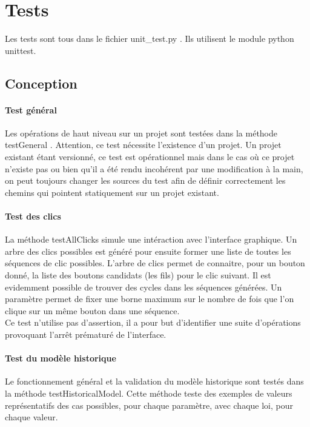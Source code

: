 \documentclass[12pt,a4paper]{article}
\begin{document}
\section{Tests}
    Les tests sont tous dans le fichier unit\_test.py . Ils utilisent le module
    python unittest.
    \subsection{Conception}
    \paragraph{Test général}
    Les opérations de haut niveau sur un projet sont testées dans la méthode
    testGeneral . Attention, ce test nécessite l'existence d'un projet. 
    Un projet existant étant versionné, ce test est opérationnel mais dans le
    cas où ce projet n'existe pas ou bien qu'il a été rendu incohérent par une
    modification à la main, on peut toujours changer les sources du test afin de
    définir correctement les chemins qui pointent statiquement sur un projet
    existant.
    \paragraph{Test des clics}
    La méthode testAllClicks simule une intéraction avec l'interface graphique.
    Un arbre des clics possibles est généré pour ensuite former une liste de
    toutes les séquences de clic possibles. L'arbre de clics permet de
    connaitre, pour un bouton donné, la liste des boutons candidats (les fils)
    pour le clic suivant. Il est evidemment possible de trouver des cycles dans
    les séquences générées. Un paramètre permet de fixer une borne maximum sur
    le nombre de fois que l'on clique sur un même bouton dans une séquence. \\

    Ce test n'utilise pas d'assertion, il a pour but d'identifier une suite
    d'opérations provoquant l'arrêt prématuré de l'interface.

    \paragraph{Test du modèle historique}
    Le fonctionnement général et la validation du modèle historique sont testés 
    dans la méthode testHistoricalModel. Cette méthode teste des exemples de valeurs
    représentatifs des cas possibles, pour chaque paramètre, avec chaque loi, pour
    chaque valeur.
\end{document}
